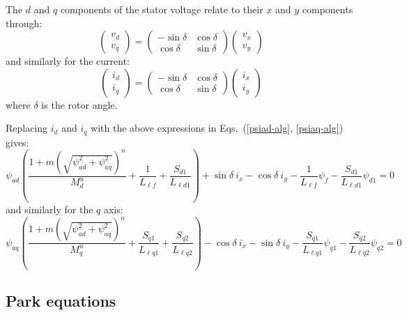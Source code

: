 The $d$ and $q$ components of the stator voltage relate to their $x$ and $y$ components through:
\begin{equation}\label{park-volt}
\left( \begin{array}{c} v_d \\ v_q \end{array} \right) = \left( \begin{array}{cc} - \sin \delta & \cos \delta \\ \cos \delta & \sin \delta \end{array} \right) \left( \begin{array}{c} v_x \\ v_y \end{array} \right)
\end{equation}
and similarly for the current:
\begin{equation}\label{park-cur}
\left( \begin{array}{c} i_d \\ i_q \end{array} \right) = \left( \begin{array}{cc} - \sin \delta & \cos \delta \\ \cos \delta & \sin \delta \end{array} \right) \left( \begin{array}{c} i_x \\ i_y \end{array} \right)
\end{equation}
where $\delta$ is the rotor angle.

Replacing $i_d$ and $i_q$ with the above expressions in Eqs.~(\ref{psiad-alg}, \ref{psiaq-alg}) gives:
\begin{equation}\label{psiad-alg-xy}
\psi_{ad} \left( \frac{1 + m ( \sqrt{\psi_{ad}^2 + \psi_{aq}^2} )^n}{M_d^u} + \frac{1}{L_{\ell f}} + \frac{S_{d1}}{L_{\ell d1}} \right) + \sin \delta \: i_x - \cos \delta \: i_y - \frac{1}{L_{\ell f}} \psi_f - \frac{S_{d1}}{L_{\ell d1}} \psi_{d1} = 0
\end{equation}
and similarly for the $q$ axis:
\begin{equation}\label{psiaq-alg-xy}
\psi_{aq} \left( \frac{1 + m ( \sqrt{\psi_{ad}^2 + \psi_{aq}^2} )^n}{M_q^u} + \frac{S_{q1}}{L_{\ell q1}} + \frac{S_{q2}}{L_{\ell q2}} \right) - \cos \delta \: i_x - \sin \delta \: i_y - \frac{S_{q1}}{L_{\ell q1}} \psi_{q1} - \frac{S_{q2}}{L_{\ell q2}} \psi_{q2} = 0
\end{equation}

\subsection{Park equations}

